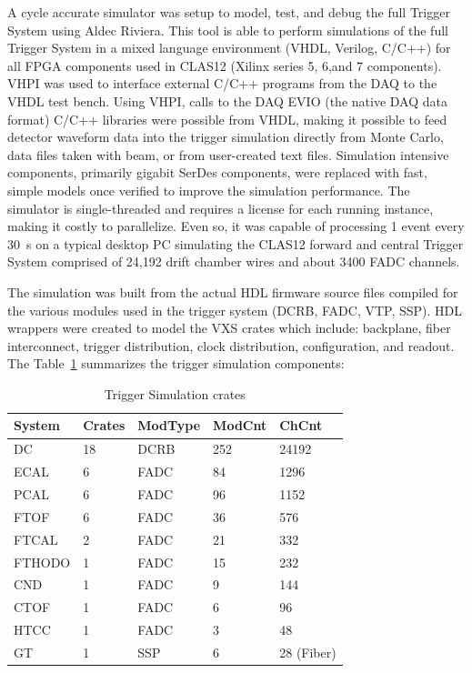 A cycle accurate simulator was setup to model, test, and debug the full Trigger System using Aldec Riviera. This tool is able to perform simulations of the full Trigger System in a mixed language environment (VHDL, Verilog, C/C++) for all FPGA components used in CLAS12 (Xilinx series 5, 6,and 7 components). VHPI was used to interface external C/C++ programs from the DAQ to the VHDL test bench. Using VHPI, calls to the DAQ EVIO (the native DAQ data format) C/C++ libraries were possible from VHDL, making it possible to feed detector waveform data into the trigger simulation directly from Monte Carlo, data files taken with beam, or from user-created text files. Simulation intensive components, primarily gigabit SerDes components, were replaced with fast, simple models once verified to improve the simulation performance. The simulator is single-threaded and requires a license for each running instance, making it costly to parallelize. Even so, it was capable of processing 1 event every 30~s on a typical desktop PC simulating the CLAS12 forward and central Trigger System comprised of 24,192 drift chamber wires and about 3400 FADC channels.

The simulation was built from the actual HDL firmware source files compiled for the various modules used in the trigger system (DCRB, FADC, VTP, SSP). HDL wrappers were created to model the VXS crates which include: backplane, fiber interconnect, trigger distribution, clock distribution, configuration, and readout. The Table~\ref{tab:trig_sim_crates} summarizes the trigger simulation components:

\begin{table}
\begin{center}
	\begin{tabular}{| l | l | l | l | l |}
		\hline \hline
		System		& Crates	& ModType	& ModCnt	& ChCnt		\\
		\hline
		DC			& 18		& DCRB		& 252		& 24192		\\
		ECAL		& 6			& FADC		& 84		& 1296	 	\\
		PCAL		& 6			& FADC		& 96		& 1152	 	\\
		FTOF		& 6			& FADC		& 36		& 576	 	\\
		FTCAL		& 2			& FADC		& 21		& 332	 	\\
		FTHODO		& 1			& FADC		& 15		& 232	 	\\
		CND			& 1			& FADC		& 9			& 144	 	\\
		CTOF		& 1			& FADC		& 6			& 96	 	\\
		HTCC		& 1			& FADC		& 3			& 48	 	\\
		GT			& 1			& SSP		& 6			& 28 (Fiber)	\\
		\hline \hline
	\end{tabular}
\end{center}
\caption{Trigger Simulation crates}
\label{tab:trig_sim_crates}
\end{table}

